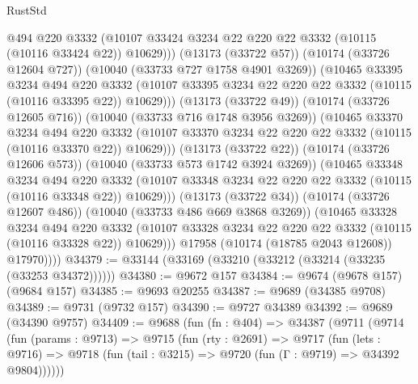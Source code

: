 \begin{lexlean}{RustStd}
\begin{coremodule}
                        @494
                        @220
                        @3332
                        (@10107
                          @33424
                          @3234
                          @22
                          @220
                          @22
                          @3332
                          (@10115 (@10116 @33424 @22))
                          @10629)))
                    (@13173 (@33722 @57))
                    (@10174 (@33726 @12604 @727))
                    (@10040 (@33733 @727 @1758 @4901 @3269))
                    (@10465
                      @33395
                      @3234
                      @494
                      @220
                      @3332
                      (@10107 @33395 @3234 @22 @220 @22 @3332 (@10115 (@10116 @33395 @22)) @10629)))
                  (@13173 (@33722 @49))
                  (@10174 (@33726 @12605 @716))
                  (@10040 (@33733 @716 @1748 @3956 @3269))
                  (@10465
                    @33370
                    @3234
                    @494
                    @220
                    @3332
                    (@10107 @33370 @3234 @22 @220 @22 @3332 (@10115 (@10116 @33370 @22)) @10629)))
                (@13173 (@33722 @22))
                (@10174 (@33726 @12606 @573))
                (@10040 (@33733 @573 @1742 @3924 @3269))
                (@10465
                  @33348
                  @3234
                  @494
                  @220
                  @3332
                  (@10107 @33348 @3234 @22 @220 @22 @3332 (@10115 (@10116 @33348 @22)) @10629)))
              (@13173 (@33722 @34))
              (@10174 (@33726 @12607 @486))
              (@10040 (@33733 @486 @669 @3868 @3269))
              (@10465
                @33328
                @3234
                @494
                @220
                @3332
                (@10107 @33328 @3234 @22 @220 @22 @3332 (@10115 (@10116 @33328 @22)) @10629)))
            @17958
            (@10174 (@18785 @2043 @12608))
            @17970))))
@34379 := @33144 (@33169 (@33210 (@33212 (@33214 (@33235 (@33253 @34372))))))
@34380 := @9672 @157
@34384 := @9674 (@9678 @157) (@9684 @157)
@34385 := @9693 @20255
@34387 := @9689 (@34385 @9708)
@34389 := @9731 (@9732 @157)
@34390 := @9727 @34389
@34392 := @9689 (@34390 @9757)
@34409 := @9688
    (fun (fn : @404) =>
    @34387
      (@9711
        (@9714
          (fun (params : @9713) =>
          @9715
            (fun (rty : @2691) =>
            @9717
              (fun (lets : @9716) =>
              @9718 (fun (tail : @3215) => @9720 (fun (Γ : @9719) => @34392 @9804))))))

\end{coremodule}
\end{lexlean}
